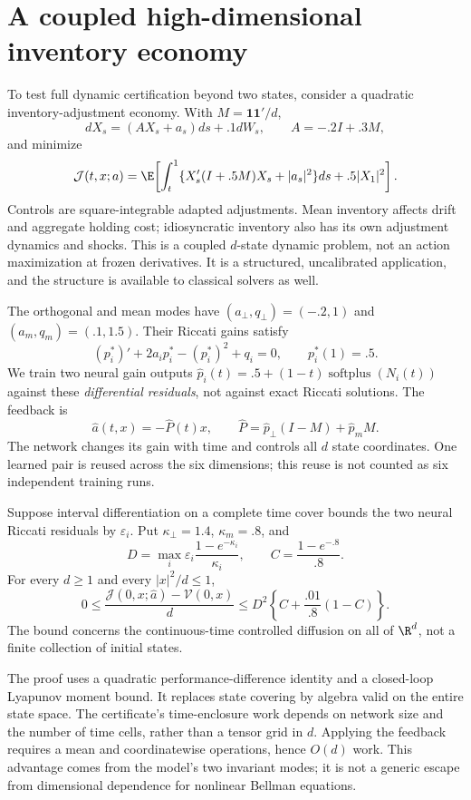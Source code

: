 \section{A coupled high-dimensional inventory economy}\label{sec:inventory}
To test full dynamic certification beyond two states, consider a quadratic inventory-adjustment economy. With $M=\mathbf1\mathbf1'/d$,
\begin{equation}
 dX_s=(AX_s+a_s)ds+.1dW_s,\qquad A=-.2I+.3M,\label{eq:inventorydynamics}
\end{equation}
and minimize
\begin{equation}
 \mathcal J(t,x;a)=\E\!\left[\int_t^1\{X_s'(I+.5M)X_s+|a_s|^2\}ds+.5|X_1|^2\right].
 \label{eq:inventorycriterion}
\end{equation}
Controls are square-integrable adapted adjustments. Mean inventory affects drift and aggregate holding cost; idiosyncratic inventory also has its own adjustment dynamics and shocks. This is a coupled $d$-state dynamic problem, not an action maximization at frozen derivatives. It is a structured, uncalibrated application, and the structure is available to classical solvers as well.

The orthogonal and mean modes have $(a_\perp,q_\perp)=(-.2,1)$ and $(a_m,q_m)=(.1,1.5)$. Their Riccati gains satisfy
\[
 (p_i^*)'+2a_i p_i^*-(p_i^*)^2+q_i=0,\qquad p_i^*(1)=.5.
\]
We train two neural gain outputs $\widehat p_i(t)=.5+(1-t)\operatorname{softplus}(N_i(t))$ against these \emph{differential residuals}, not against exact Riccati solutions. The feedback is
\[
 \widehat a(t,x)=-\widehat P(t)x,\qquad
 \widehat P=\widehat p_\perp(I-M)+\widehat p_mM.
\]
The network changes its gain with time and controls all $d$ state coordinates. One learned pair is reused across the six dimensions; this reuse is not counted as six independent training runs.

\begin{theorem}\label{thm:inventory}
Suppose interval differentiation on a complete time cover bounds the two neural Riccati residuals by $\varepsilon_i$. Put $\kappa_\perp=1.4$, $\kappa_m=.8$, and
\[
 D=\max_i\varepsilon_i\frac{1-e^{-\kappa_i}}{\kappa_i},\qquad
 C=\frac{1-e^{-.8}}{.8}.
\]
For every $d\geq1$ and every $|x|^2/d\leq1$,
\begin{equation}
 0\leq\frac{\mathcal J(0,x;\widehat a)-\mathcal V(0,x)}d
 \leq D^2\left\{C+\frac{.01}{.8}(1-C)\right\}.
 \label{eq:inventorycertificate}
\end{equation}
The bound concerns the continuous-time controlled diffusion on all of $\R^d$, not a finite collection of initial states.
\end{theorem}
The proof uses a quadratic performance-difference identity and a closed-loop Lyapunov moment bound. It replaces state covering by algebra valid on the entire state space. The certificate's time-enclosure work depends on network size and the number of time cells, rather than a tensor grid in $d$. Applying the feedback requires a mean and coordinatewise operations, hence $O(d)$ work. This advantage comes from the model's two invariant modes; it is not a generic escape from dimensional dependence for nonlinear Bellman equations.

